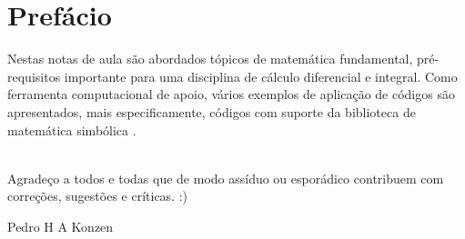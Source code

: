 
\chapter*{Prefácio}\label{prefacio}

Nestas notas de aula são abordados tópicos de matemática fundamental, pré-requisitos importante para uma disciplina de cálculo diferencial e integral. Como ferramenta computacional de apoio, vários exemplos de aplicação de códigos \python\; são apresentados, mais especificamente, códigos com suporte da biblioteca de matemática simbólica \sympy.

~\\

Agradeço a todos e todas que de modo assíduo ou esporádico contribuem com correções, sugestões e críticas. :)

\begin{flushright}
  Pedro H A Konzen
\end{flushright}


